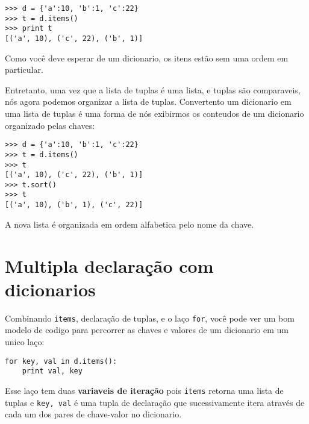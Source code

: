 \beforeverb
\begin{verbatim}
>>> d = {'a':10, 'b':1, 'c':22}
>>> t = d.items()
>>> print t
[('a', 10), ('c', 22), ('b', 1)]
\end{verbatim}
\afterverb
%
Como você deve esperar de um dicionario, os itens estão sem
uma ordem em particular.

Entretanto, uma vez que a lista de tuplas é uma lista, e tuplas são comparaveis,
nós agora podemos organizar a lista de tuplas. Convertento um dicionario
em uma lista de tuplas é uma forma de nós exibirmos os conteudos de um
dicionario organizado pelas chaves:

\beforeverb
\begin{verbatim}
>>> d = {'a':10, 'b':1, 'c':22}
>>> t = d.items()
>>> t
[('a', 10), ('c', 22), ('b', 1)]
>>> t.sort()
>>> t
[('a', 10), ('b', 1), ('c', 22)]
\end{verbatim}
\afterverb
%
A nova lista é organizada em ordem alfabetica pelo nome da chave.

\section{Multipla declaração com dicionarios}


Combinando {\tt items}, declaração de tuplas, e o laço {\tt for}, você
pode ver um bom modelo de codigo para percorrer as chaves e valores de um
dicionario em um unico laço:

\beforeverb
\begin{verbatim}
for key, val in d.items():
    print val, key
\end{verbatim}
\afterverb
%
Esse laço tem duas {\bf variaveis de iteração} pois {\tt items} retorna
uma lista de tuplas e {\tt key, val} é uma tupla de declaração
que sucessivamente itera através de cada um dos pares de chave-valor no
dicionario.


